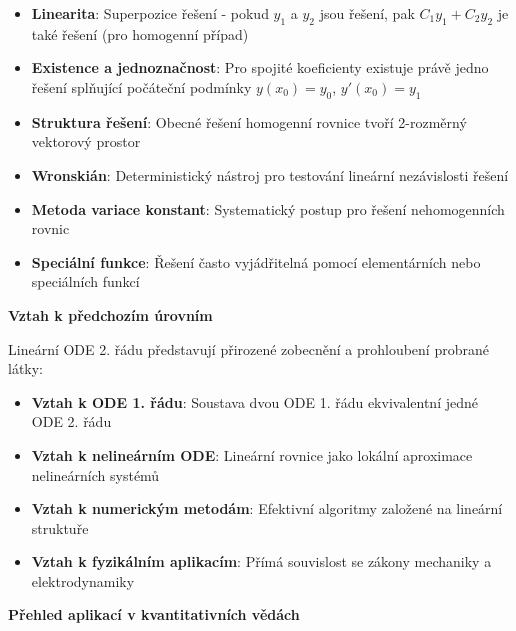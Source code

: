\begin{itemize}
\item \textbf{Linearita}: Superpozice řešení - pokud $y_1$ a $y_2$ jsou řešení, pak $C_1y_1 + C_2y_2$ je také řešení (pro homogenní případ)

\item \textbf{Existence a jednoznačnost}: Pro spojité koeficienty existuje právě jedno řešení splňující počáteční podmínky $y(x_0) = y_0$, $y'(x_0) = y_1$

\item \textbf{Struktura řešení}: Obecné řešení homogenní rovnice tvoří 2-rozměrný vektorový prostor

\item \textbf{Wronskián}: Deterministický nástroj pro testování lineární nezávislosti řešení

\item \textbf{Metoda variace konstant}: Systematický postup pro řešení nehomogenních rovnic

\item \textbf{Speciální funkce}: Řešení často vyjádřitelná pomocí elementárních nebo speciálních funkcí
\end{itemize}

\vspace{1\baselineskip}

\noindent\textbf{Vztah k předchozím úrovním}

Lineární ODE 2. řádu představují přirozené zobecnění a prohloubení probrané látky:

\begin{itemize}
\item \textbf{Vztah k ODE 1. řádu}: Soustava dvou ODE 1. řádu ekvivalentní jedné ODE 2. řádu

\item \textbf{Vztah k nelineárním ODE}: Lineární rovnice jako lokální aproximace nelineárních systémů

\item \textbf{Vztah k numerickým metodám}: Efektivní algoritmy založené na lineární struktuře

\item \textbf{Vztah k fyzikálním aplikacím}: Přímá souvislost se zákony mechaniky a elektrodynamiky
\end{itemize}

\vspace{1\baselineskip}

\noindent\textbf{Přehled aplikací v kvantitativních vědách}

